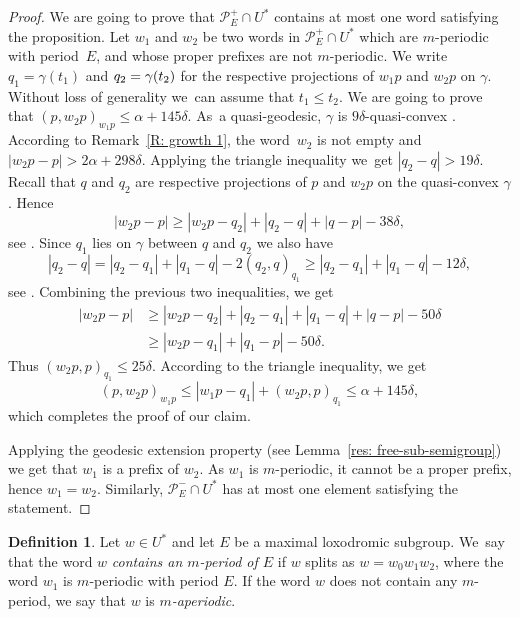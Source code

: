 \documentclass[JEP,XML,SOM,Unicode, NoEqCountersInSection,published]{cedram}
\let\mathcal\mathscr
\theoremstyle{plain}
\theoremstyle{definition}
\newtheorem{df}[thm]{Definition}
\begin{document}
\begin{proof}
We are going to prove that $\mathcal P^+_E \cap U^*$ contains at most one word satisfying the proposition.
Let $w_1$ and $w_2$ be two words in $\mathcal P^+_E \cap U^*$ which are $m$-periodic with period~$E$, and whose proper prefixes are not $m$-periodic.
We write $q_1 = \gamma(t_1)$ and $q_2 =\nobreak \gamma(t_2)$ for the respective projections of $w_1p$ and $w_2p$ on $\gamma$.
Without loss of generality we~can assume that $t_1 \leq t_2$.
We are going to prove that $(p, w_2p)_{w_1p} \leq \alpha + 145\delta$.
As~a quasi-geodesic, $\gamma$ is $9\delta$-quasi-convex \cite[Cor.\,2.7(2)]{coulon_geometry_2014}.
According to Remark~\ref{R: growth 1}, the word~$w_2$ is not empty and $|w_2p - p| > 2\alpha + 298\delta$.
Applying the triangle inequality we~get $|q_2-q| > 19\delta$.
Recall that $q$ and $q_2$ are respective projections of $p$ and $w_2p$ on the quasi-convex $\gamma$.
Hence
\begin{equation*}
|w_2p - p| \geq |w_2p - q_2| + |q_2 - q| + |q - p| - 38\delta,
\end{equation*}
see \cite[Cor.\,2.12(2)]{coulon_geometry_2014}.
Since $q_1$ lies on $\gamma$ between $q$ and $q_2$ we also have
\begin{equation*}
|q_2 - q| = |q_2 - q_1| + |q_1 - q| - 2(q_2,q)_{q_1}
\geq |q_2 - q_1| + |q_1 - q| - 12\delta,
\end{equation*}
see \cite[Cor.\,2.7(1)]{coulon_geometry_2014}.
Combining the previous two inequalities, we get
\begin{align*}
|w_2p - p| & \geq |w_2p - q_2| + |q_2 - q_1| + |q_1 - q| + |q - p| - 50\delta \\
& \geq |w_2p - q_1| + |q_1 - p| - 50\delta.
\end{align*}
Thus $(w_2p,p)_{q_1} \leq 25\delta$.
According to the triangle inequality, we get
\begin{equation*}
(p, w_2p)_{w_1p} \leq |w_1p - q_1| + (w_2p,p)_{q_1} \leq \alpha + 145\delta,
\end{equation*}
which completes the proof of our claim.

Applying the geodesic extension property (see Lemma~\ref{res: free-sub-semigroup}) we get that $w_1$ is a prefix of $w_2$.
As $w_1$ is $m$-periodic, it cannot be a proper prefix, hence $w_1 = w_2$.
Similarly, $\mathcal P^-_E \cap U^*$ has at most one element satisfying the statement.
\end{proof}


\begin{df} Let $w\in U^*$ and let $E$ be a maximal loxodromic subgroup.
We~say that the word $w$ \emph{contains an $m$-period of $E$} if $w$ splits as $w=w_0w_1w_2$, where the word $w_1$ is $m$-periodic with period $E$.
If the word $w$ does not contain any $m$-period, we say that $w$ is \emph{$m$-aperiodic}.
\end{df}
\end{document}
